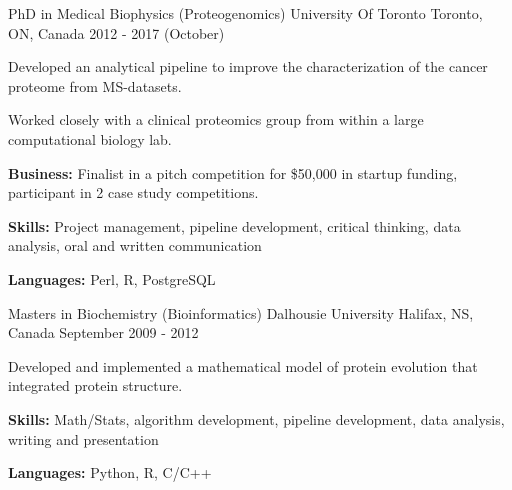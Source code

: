 


\begin{cventries}

\cventry
{PhD in Medical Biophysics (Proteogenomics)} %
{University Of Toronto} %
{Toronto, ON,  Canada} %
	{2012 - 2017 (October)} %
{ %
 \begin{cvitems}
 \item {Developed an analytical pipeline to improve the characterization of the cancer proteome from MS-datasets.}
 \item {Worked closely with a clinical proteomics group from within a large computational biology lab.}
 \item {\textbf{Business:} Finalist in a pitch competition for \$50,000 in startup funding, participant in 2 case study competitions.}
 \item {\textbf{Skills:} Project management, pipeline development, critical thinking, data analysis, oral and written communication}
 \item {\textbf{Languages:} Perl, R, PostgreSQL}
 \end{cvitems}
}

\cventry
{Masters in Biochemistry (Bioinformatics)} %
{Dalhousie University} %
{Halifax, NS, Canada} %
{September 2009 - 2012} %
{
 \begin{cvitems}
 \item {Developed and implemented a mathematical model of protein evolution that integrated protein structure.}
 \item {\textbf{Skills:} Math/Stats, algorithm development, pipeline development, data analysis, writing and presentation}
 \item {\textbf{Languages:} Python, R, C/C++}
 \end{cvitems}
}


\end{cventries}
